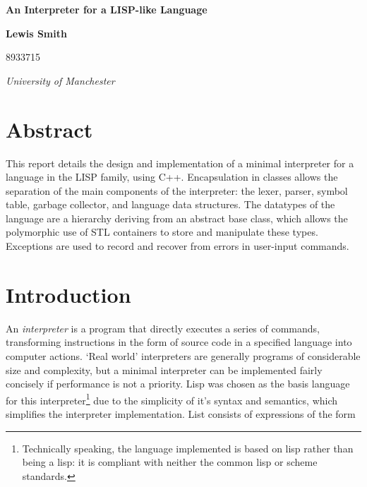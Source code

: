 \documentclass[12pt]{article}
\begin{document}
\lstset{language=Lisp}


\thispagestyle{empty}

\vspace*{15mm}

\begin{center}
{\Large\bf
An Interpreter for a LISP-like Language
}

\vspace*{5mm}

\end{center}
\vspace*{5mm} \noindent
\vskip 0.5cm
\centerline{\bf
Lewis Smith
}
\centerline{
8933715
}

\vskip 5mm
\vskip 5mm
\centerline{\em University of Manchester }

\vskip 20mm
\vskip 20mm
\section*{Abstract}



This report details the design and implementation of a minimal
interpreter for a language in the LISP family, using C++.
Encapsulation in classes allows the separation of the main components
of the interpreter: the lexer, parser, symbol table, garbage
collector, and language data structures. The datatypes of the language
are a hierarchy deriving from an abstract base class, which allows the
polymorphic use of STL containers to store and manipulate these types.
Exceptions are used to record and recover from errors in user-input
commands.


 
\section{ Introduction }

An \textit{interpreter} is a program that directly executes a series
of commands, transforming instructions in the form of source code in a
specified language into computer actions. `Real world' interpreters
are generally programs of considerable size and complexity, but a
minimal interpreter can be implemented fairly concisely if performance
is not a priority. Lisp was chosen as the basis language for this
interpreter\footnote{
Technically speaking, the language implemented is
based on lisp rather than being a lisp: it is compliant with neither
the common lisp or scheme standards.}
due to the simplicity of it's syntax and semantics, which simplifies
the interpreter implementation. List consists of expressions of the
form
\end{document}
